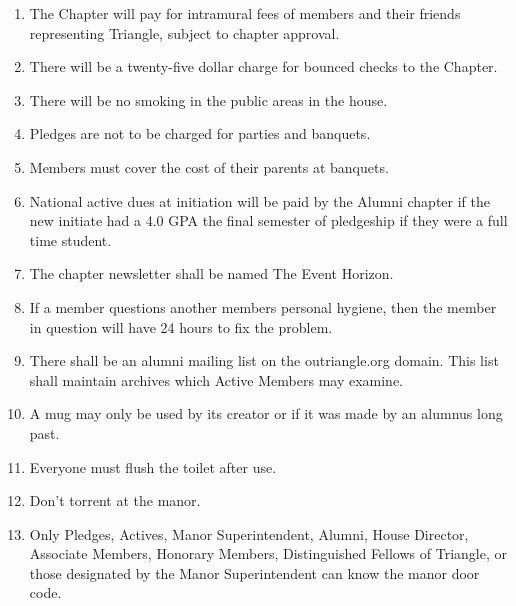 \begin{enumerate}
\item The Chapter will pay for intramural fees of members and their friends representing Triangle, subject to chapter approval. 
\item There will be a twenty-five dollar charge for bounced checks to the Chapter. 
\item There will be no smoking in the public areas in the house.  
\item Pledges are not to be charged for parties and banquets.  
\item Members must cover the cost of their parents at banquets.  
\item National active dues at initiation will be paid by the Alumni chapter if the new initiate had a 4.0 GPA the final semester of pledgeship if they were a full time student.
\item The chapter newsletter shall be named The Event Horizon. 
\item If a member questions another members personal hygiene, then the member in question will have 24 hours to fix the problem.
\item There shall be an alumni mailing list on the outriangle.org domain. This list shall maintain archives which Active Members may examine.
\item A mug may only be used by its creator or if it was made by an alumnus long past.
\item Everyone must flush the toilet after use.
\item Don’t torrent at the manor.
\item Only Pledges, Actives, Manor Superintendent, Alumni, House Director, Associate Members, Honorary Members, Distinguished Fellows of Triangle, or those designated by the Manor Superintendent can know the manor door code.
\end{enumerate}
